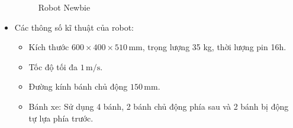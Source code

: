 \begin{itemize}
\begin{figure}[H]
                \caption{Robot Newbie}
                \label{chap1_pic12}
            \end{figure}
            \item Các thông số kĩ thuật của robot:
                \begin{itemize}[label=\textendash]
                    \item Kích thước $600 \times 400 \times 510 \,\mathrm{mm}$, trọng lượng 35 kg, thời lượng pin 16h.
                    \item Tốc độ tối đa $1 \,\mathrm{m/s}$.
                    \item Đường kính bánh chủ động $150 \,\mathrm{mm}$.
                    \item Bánh xe: Sử dụng 4 bánh, 2 bánh chủ động phía sau và 2 bánh bị động tự lựa phía trước.
                \end{itemize}
        \end{itemize}



